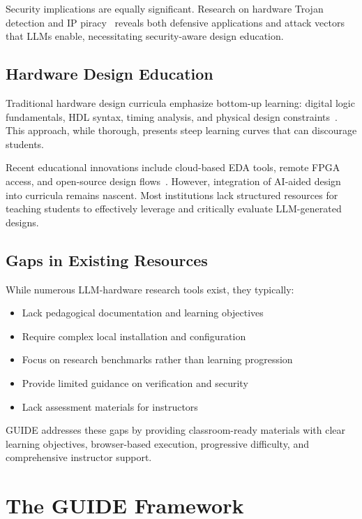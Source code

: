 \documentclass[10pt,conference]{IEEEtran}
\begin{document}
Security implications are equally significant. Research on hardware Trojan detection and IP piracy~\cite{llmpirate} reveals both defensive applications and attack vectors that LLMs enable, necessitating security-aware design education.

\subsection{Hardware Design Education}

Traditional hardware design curricula emphasize bottom-up learning: digital logic fundamentals, HDL syntax, timing analysis, and physical design constraints~\cite{traditional-vlsi-edu}. This approach, while thorough, presents steep learning curves that can discourage students.

Recent educational innovations include cloud-based EDA tools, remote FPGA access, and open-source design flows~\cite{cloud-eda-edu}. However, integration of AI-aided design into curricula remains nascent. Most institutions lack structured resources for teaching students to effectively leverage and critically evaluate LLM-generated designs.

\subsection{Gaps in Existing Resources}

While numerous LLM-hardware research tools exist, they typically:
\begin{itemize}
    \item Lack pedagogical documentation and learning objectives
    \item Require complex local installation and configuration
    \item Focus on research benchmarks rather than learning progression
    \item Provide limited guidance on verification and security
    \item Lack assessment materials for instructors
\end{itemize}

GUIDE addresses these gaps by providing classroom-ready materials with clear learning objectives, browser-based execution, progressive difficulty, and comprehensive instructor support.

\section{The GUIDE Framework}
\label{sec:framework}
\end{document}
